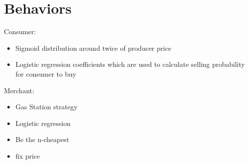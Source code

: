 \section{Behaviors}
\label{sec:Behaviors}
Consumer:
\begin{itemize}
\item Sigmoid distribution around twice of producer price
\item Logistic regression coefficients which are used to calculate selling probability for consumer to buy
\end{itemize}

Merchant:
\begin{itemize}
\item Gas Station strategy
\item Logistic regression 
\item Be the n-cheapest
\item fix price
\end{itemize}